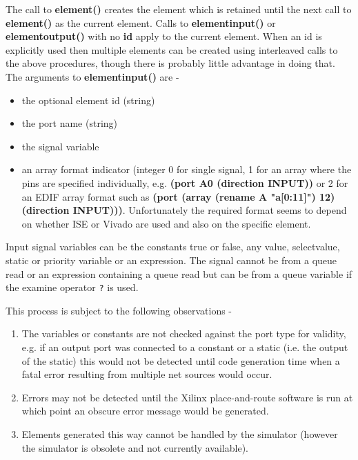     
    The call to {\bf element()} creates the element which is retained until the
    next call to {\bf element()} as the current element. Calls to {\bf
    elementinput()}  or {\bf elementoutput()} with no {\bf id} apply to the
    current element. When an id is explicitly used then multiple elements can
    be created using interleaved calls to the above procedures, though there is
    probably little advantage in doing that. The arguments to {\bf
    elementinput()} are -
    \begin{itemize}
    \item   the optional element id (string)
    \item   the port name (string)
    \item   the signal variable
    \item   an array format indicator (integer 0 for single signal, 1 for an array
            where the pins are specified individually, e.g.
            {\bf (port A0 (direction INPUT))} or 2 for an EDIF
            array format such as {\bf (port (array (rename A "a[0:11]") 12) (direction INPUT)))}.
            Unfortunately the required format seems to depend on whether ISE or
            Vivado are used and also on the specific element.
    \end{itemize}
    Input signal variables can be the constants true or false, any value,
    selectvalue, static or priority variable or an expression. The signal cannot be
    from a queue read or an expression containing a queue read but can be from a queue
    variable if the examine operator \verb'?' is used.
    
    This process is subject to the following observations -
    \begin{enumerate}
    \item   The variables or constants are not checked against the port
            type for validity, e.g. if an output port was connected to a
            constant or a static (i.e. the output of the static) this
            would not be detected until code generation time when a fatal
            error resulting from multiple net sources would occur.
    \item   Errors may not be detected until the Xilinx place-and-route
            software is run at which point an obscure error message
            would be generated.
    \item   Elements generated this way cannot be handled by the simulator
            (however the simulator is obsolete and not currently available).
    \end{enumerate}

